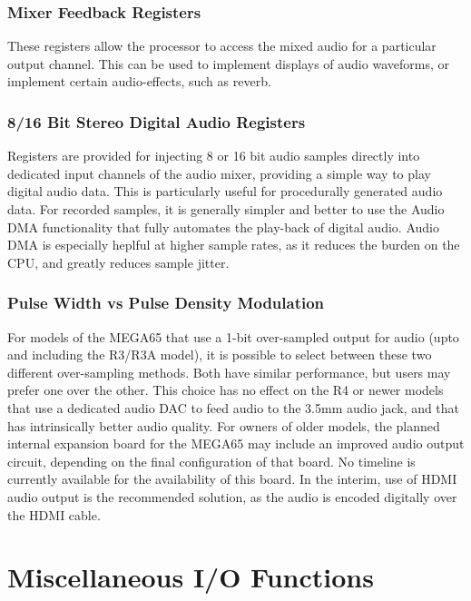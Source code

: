 \subsubsection{Mixer Feedback Registers}

These registers allow the processor to access the mixed audio for a particular
output channel. This can be used to implement displays of audio waveforms,
or implement certain audio-effects, such as reverb.

\subsubsection{8/16 Bit Stereo Digital Audio Registers}

Registers are provided for injecting 8 or 16 bit audio samples directly into
dedicated input channels of the audio mixer, providing a simple way to play
digital audio data. This is particularly useful for procedurally generated
audio data. For recorded samples, it is generally simpler and better to use the
Audio DMA functionality that fully automates the play-back of digital audio.
Audio DMA is especially heplful at higher sample rates, as it reduces the burden
on the CPU, and greatly reduces sample jitter.

\subsubsection{Pulse Width vs Pulse Density Modulation}

For models of the MEGA65 that use a 1-bit over-sampled output for audio (upto and
including the R3/R3A model), it is possible to select between these two different
over-sampling methods.  Both have similar performance, but users may prefer one
over the other.  This choice has no effect on the R4 or newer models that use a
dedicated audio DAC to feed audio to the 3.5mm audio jack, and that has intrinsically
better audio quality.  For owners of older models, the planned internal expansion
board for the MEGA65 may include an improved audio output circuit, depending on
the final configuration of that board.  No timeline is currently available for the
availability of this board. In the interim, use of HDMI audio output is the recommended
solution, as the audio is encoded digitally over the HDMI cable.




\section{Miscellaneous I/O Functions}

